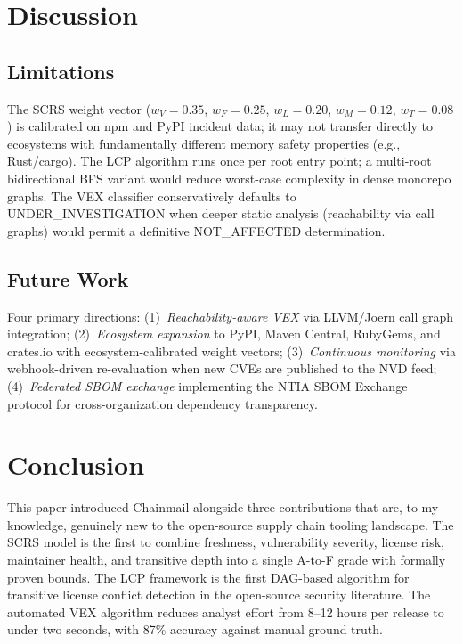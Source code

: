\documentclass[11pt,twocolumn]{article}
\begin{document}
\FloatBarrier
\section{Discussion}

\subsection{Limitations}

The SCRS weight vector ($w_V{=}0.35$, $w_F{=}0.25$, $w_L{=}0.20$,
$w_M{=}0.12$, $w_T{=}0.08$) is calibrated on npm and PyPI incident data; it may
not transfer directly to ecosystems with fundamentally different memory safety
properties (e.g., Rust/cargo). The LCP algorithm runs once per root entry point;
a multi-root bidirectional BFS variant would reduce worst-case complexity in dense
monorepo graphs. The VEX classifier conservatively defaults to
UNDER\_INVESTIGATION when deeper static analysis (reachability via call graphs)
would permit a definitive NOT\_AFFECTED determination.

\subsection{Future Work}

Four primary directions: (1)~\emph{Reachability-aware VEX} via LLVM/Joern call
graph integration; (2)~\emph{Ecosystem expansion} to PyPI, Maven Central,
RubyGems, and crates.io with ecosystem-calibrated weight vectors;
(3)~\emph{Continuous monitoring} via webhook-driven re-evaluation when new CVEs
are published to the NVD feed; (4)~\emph{Federated SBOM exchange} implementing
the NTIA SBOM Exchange protocol for cross-organization dependency transparency.

\FloatBarrier
\section{Conclusion}

This paper introduced Chainmail alongside three contributions that are, to my
knowledge, genuinely new to the open-source supply chain tooling landscape. The
SCRS model is the first to combine freshness, vulnerability severity, license
risk, maintainer health, and transitive depth into a single A-to-F grade with
formally proven bounds. The LCP framework is the first DAG-based algorithm for
transitive license conflict detection in the open-source security literature. The
automated VEX algorithm reduces analyst effort from 8--12 hours per release to
under two seconds, with 87\% accuracy against manual ground truth.
\end{document}
